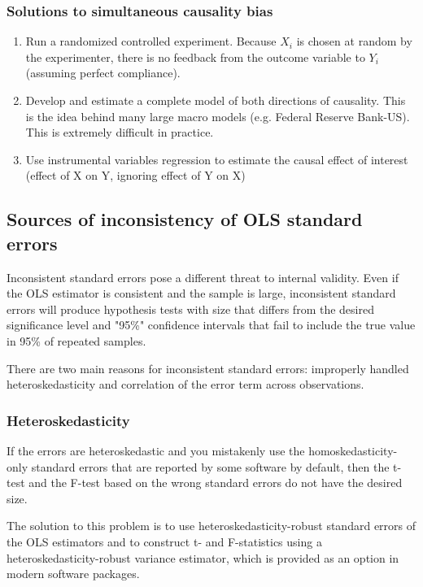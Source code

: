 \documentclass[a4paper,11pt]{article}
\begin{document}
\subsubsection*{Solutions to simultaneous causality bias}
\label{sec:org0a95d1d}
\begin{enumerate}
\item Run a randomized controlled experiment.  Because \(X_i\) is chosen at
random by the experimenter, there is no feedback from the outcome
variable to \(Y_i\) (assuming perfect compliance).
\item Develop and estimate a complete model of both directions of
causality.  This is the idea behind many large macro models
(e.g. Federal Reserve Bank-US).  This is extremely difficult in
practice.
\item Use instrumental variables regression to estimate the causal effect
of interest (effect of X on Y, ignoring effect of Y on X)
\end{enumerate}

\subsection{Sources of inconsistency of OLS standard errors}
\label{sec:orgb87a080}
Inconsistent standard errors pose a different threat to internal
validity. Even if the OLS estimator is consistent and the sample is
large, inconsistent standard errors will produce hypothesis tests with
size that differs from the desired significance level and "95\%"
confidence intervals that fail to include the true value in 95\% of
repeated samples. 

There are two main reasons for inconsistent standard errors:
improperly handled heteroskedasticity and correlation of the error
term across observations.

\subsubsection*{Heteroskedasticity}
\label{sec:orgebe4d3b}
If the errors are heteroskedastic and you mistakenly use the
homoskedasticity-only standard errors that are reported by some
software by default, then the t-test and the F-test based on the wrong
standard errors do not have the desired size. 

The solution to this problem is to use heteroskedasticity-robust
standard errors of the OLS estimators and to construct t- and
F-statistics using a heteroskedasticity-robust variance estimator,
which is provided as an option in modern software packages. 
\end{document}
